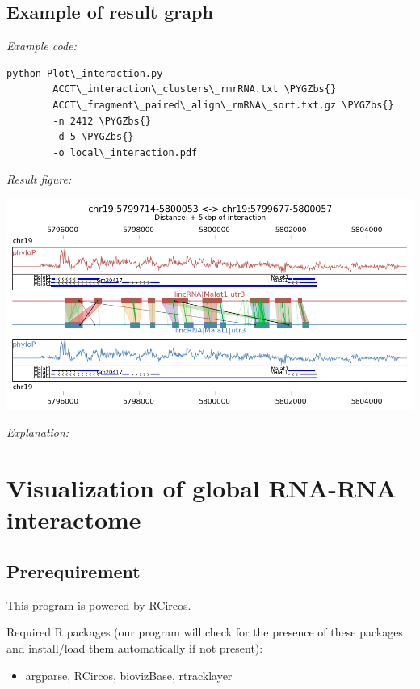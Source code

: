 \documentclass[letterpaper,10pt,english]{sphinxmanual}
\def\PYGZbs{\char`\\}
\begin{document}
\section{Example of result graph}
\label{Visualization:example-of-result-graph}
\emph{Example code:}

\begin{Verbatim}[commandchars=\\\{\}]
python Plot\_interaction.py
        ACCT\_interaction\_clusters\_rmrRNA.txt \PYGZbs{}
        ACCT\_fragment\_paired\_align\_rmRNA\_sort.txt.gz \PYGZbs{}
        -n 2412 \PYGZbs{}
        -d 5 \PYGZbs{}
        -o local\_interaction.pdf
\end{Verbatim}

\emph{Result figure:}

\includegraphics{local_interaction_malat1_ACCT.jpg}

\emph{Explanation:}


\chapter{Visualization of global RNA-RNA interactome}
\label{Visualization:visualizationglobal}\label{Visualization:visualization-of-global-rna-rna-interactome}

\section{Prerequirement}
\label{Visualization:id1}
This program is powered by \href{http://cran.r-project.org/web/packages/RCircos/index.html}{RCircos}.

Required R packages (our program will check for the presence of these packages and install/load them automatically if not present):
\begin{itemize}
\item {} 
argparse, RCircos, biovizBase, rtracklayer

\end{itemize}
\end{document}
